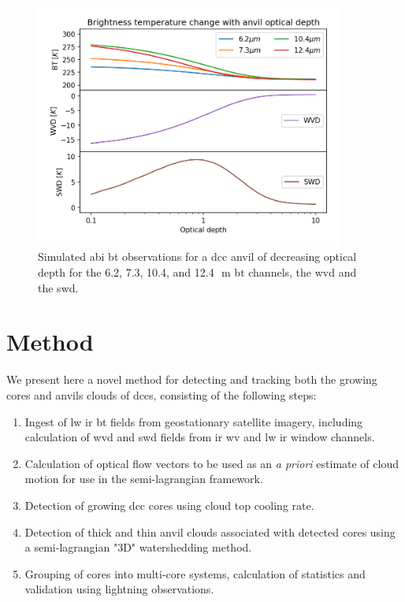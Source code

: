 \begin{figure}[tp]
    \includegraphics[width=0.9\textwidth]{figures/chapter1_09.png}
    \caption[
    Simulated \acrshort{abi} \acrshort{bt} observations for a \acrshort{dcc} anvil of decreasing optical depth
    ]{
    Simulated \acrshort{abi} \acrshort{bt} observations for a \acrshort{dcc} anvil of decreasing optical depth for the 6.2, 7.3, 10.4, and 12.4\,\unit{\mu m} \acrshort{bt} channels, the \acrshort{wvd} and the \acrshort{swd}.
    }
    \label{fig:optical_depth_channels}
\end{figure}


\section{Method}

We present here a novel method for detecting and tracking both the growing cores and anvils clouds of \acrshort{dcc}s, consisting of the following steps:

\begin{enumerate}
    \item Ingest of \acrshort{lw} \acrshort{ir} \acrshort{bt} fields from geostationary satellite imagery, including calculation of \acrshort{wvd} and \acrshort{swd} fields from \acrshort{ir} \acrshort{wv} and \acrshort{lw} \acrshort{ir} window channels.
    \item Calculation of optical flow vectors to be used as an \textit{a priori} estimate of cloud motion for use in the semi-lagrangian framework.
    \item Detection of growing \acrshort{dcc} cores using cloud top cooling rate.
    \item Detection of thick and thin anvil clouds associated with detected cores using a semi-lagrangian "3D" watershedding method. 
    \item Grouping of cores into multi-core systems, calculation of statistics and validation using lightning observations.
\end{enumerate}



